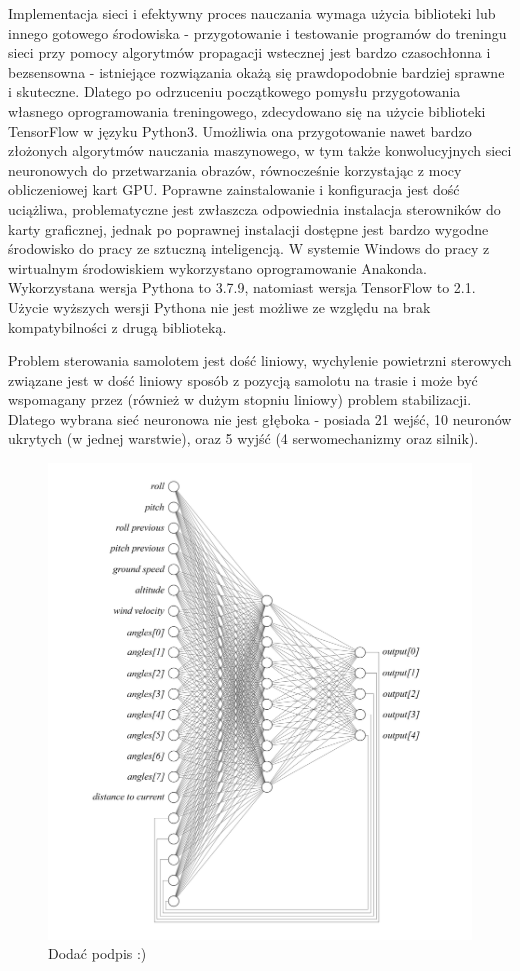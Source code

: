 \documentclass[12pt, a4paper]{article}
\begin{document}
Implementacja sieci i efektywny proces nauczania wymaga użycia biblioteki lub innego gotowego środowiska - przygotowanie i testowanie programów do treningu sieci przy pomocy algorytmów propagacji wstecznej jest bardzo czasochłonna i bezsensowna - istniejące rozwiązania okażą się prawdopodobnie bardziej sprawne i skuteczne. Dlatego po odrzuceniu początkowego pomysłu przygotowania własnego oprogramowania treningowego, zdecydowano się na użycie biblioteki TensorFlow w języku Python3. Umożliwia ona przygotowanie nawet bardzo złożonych algorytmów nauczania maszynowego, w tym także konwolucyjnych sieci neuronowych do przetwarzania obrazów, równocześnie korzystając z mocy obliczeniowej kart GPU. Poprawne zainstalowanie i konfiguracja jest dość uciążliwa, problematyczne jest zwłaszcza odpowiednia instalacja sterowników do karty graficznej, jednak po poprawnej instalacji dostępne jest bardzo wygodne środowisko do pracy ze sztuczną inteligencją. W systemie Windows do pracy z wirtualnym środowiskiem wykorzystano oprogramowanie Anakonda. Wykorzystana wersja Pythona to 3.7.9, natomiast wersja TensorFlow to 2.1. Użycie wyższych wersji Pythona nie jest możliwe ze względu na brak kompatybilności z drugą biblioteką.

Problem sterowania samolotem jest dość liniowy, wychylenie powietrzni sterowych związane jest w dość liniowy sposób z pozycją samolotu na trasie i może być wspomagany przez (również w dużym stopniu liniowy) problem stabilizacji. Dlatego wybrana sieć neuronowa nie jest głęboka - posiada 21 wejść, 10 neuronów ukrytych (w jednej warstwie), oraz 5 wyjść (4 serwomechanizmy oraz silnik).

 \begin{figure}[H]
    \centering
    \includegraphics[width=1\textwidth]{siec}
    \caption{Dodać podpis :)}
\end{figure}
\end{document}
